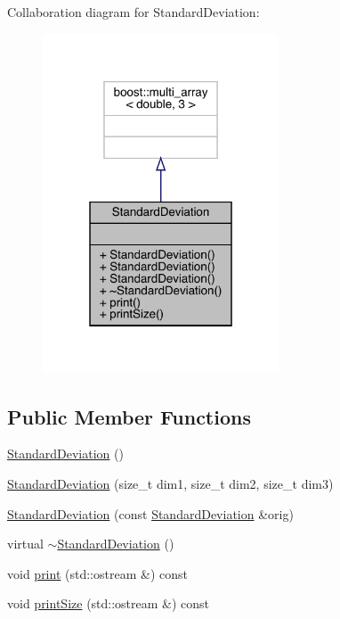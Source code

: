 Collaboration diagram for Standard\+Deviation\+:\nopagebreak
\begin{figure}[H]
\begin{center}
\leavevmode
\includegraphics[width=199pt]{class_standard_deviation__coll__graph}
\end{center}
\end{figure}
\subsection*{Public Member Functions}
\begin{DoxyCompactItemize}
\item 
\mbox{\hyperlink{class_standard_deviation_a526f8eb4fc84a43285d0ab3a8b03a601}{Standard\+Deviation}} ()
\item 
\mbox{\hyperlink{class_standard_deviation_a06f6311463d5386e8c6808582b383541}{Standard\+Deviation}} (size\+\_\+t dim1, size\+\_\+t dim2, size\+\_\+t dim3)
\item 
\mbox{\hyperlink{class_standard_deviation_aab010ad5fec21552c68cad2590bc584d}{Standard\+Deviation}} (const \mbox{\hyperlink{class_standard_deviation}{Standard\+Deviation}} \&orig)
\item 
virtual \mbox{\hyperlink{class_standard_deviation_ad6f5d7923770a9676a8a367c9679a24d}{$\sim$\+Standard\+Deviation}} ()
\item 
void \mbox{\hyperlink{class_standard_deviation_acfc4dabd868f23c413e390b36c291252}{print}} (std\+::ostream \&) const
\item 
void \mbox{\hyperlink{class_standard_deviation_aaad77ff46dc7bc16d870e8569161d9b4}{print\+Size}} (std\+::ostream \&) const
\end{DoxyCompactItemize}
